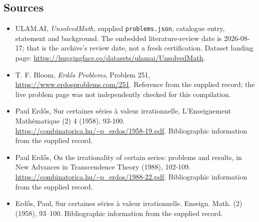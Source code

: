 \documentclass[11pt,a4paper]{article}
\begin{document}
\subsection{Sources}

{\small

\begin{itemize}

\item[\hypertarget{source:statement:1}{S1}] ULAM.AI, \emph{UnsolvedMath}, supplied \texttt{problems.json}, catalogue entry, statement and background. The embedded literature-review date is 2026-08-17; that is the archive’s review date, not a fresh certification. Dataset landing page: \url{https://huggingface.co/datasets/ulamai/UnsolvedMath}.

\item[\hypertarget{source:statement:2}{S2}] T. F. Bloom, \emph{Erdős Problems}, Problem 251, \url{https://www.erdosproblems.com/251}. Reference from the supplied record; the live problem page was not independently checked for this compilation.

\item[\hypertarget{source:statement:3}{S3}] Paul Erdős, Sur certaines séries à valeur irrationnelle, L'Enseignement Mathématique (2) 4 (1958), 93-100. \url{https://combinatorica.hu/~p_erdos/1958-19.pdf}. Bibliographic information from the supplied record.

\item[\hypertarget{source:statement:4}{S4}] Paul Erdős, On the irrationality of certain series: problems and results, in New Advances in Transcendence Theory (1988), 102-109. \url{https://combinatorica.hu/~p_erdos/1988-22.pdf}. Bibliographic information from the supplied record.

\item[\hypertarget{source:statement:5}{S5}] Erd\H{o}s, Paul, Sur certaines s\'{e}ries \`a{} valeur irrationnelle. Enseign. Math. (2) (1958), 93--100. Bibliographic information from the supplied record.

\end{itemize}

}

\label{end:statement}
\end{document}
